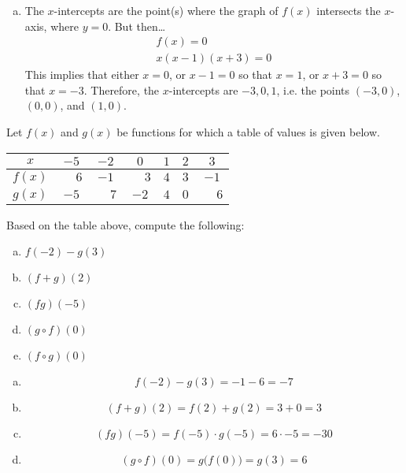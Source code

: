 \documentclass[12pt,letterpaper]{exam}
\begin{document}
\begin{questions}
\begin{enumerate}[(a)]
\item The $x$-intercepts are the point(s) where the graph of $f(x)$ intersects the $x$-axis, where $y= 0$. But then\dots
	\[
	\begin{aligned}
	f(x)= 0 \\
	x(x - 1)(x + 3)= 0
	\end{aligned}
	\]
This implies that either $x= 0$, or $x - 1=0$ so that $x= 1$, or $x + 3= 0$ so that $x= -3$. Therefore, the $x$-intercepts are $-3, 0, 1$, i.e. the points $(-3, 0)$, $(0, 0)$, and $(1, 0)$. 
\end{enumerate}



\newpage
\question[10] Let $f(x)$ and $g(x)$ be functions for which a table of values is given below. \par
	\begin{table}[ht]
	\centering
	\begin{tabular}{|c||c|c|c|c|c|c|} \hline 
	$x$ & $-5$ & $-2$ & $0$ & $1$ & $2$ & $3$ \\ \hline \hline
	$f(x)$ & $\phantom{-}6$ & $-1$ & $\phantom{-}3$ & $4$ & $3$ & $-1$ \\ \hline
	$g(x)$ & $-5$ & $\phantom{-}7$ & $-2$ & $4$ & $0$ & $\phantom{-}6$ \\ \hline 
	\end{tabular}
	\end{table} \par
Based on the table above, compute the following:
	\begin{enumerate}[(a)]
	\item $f(-2) - g(3)$
	\item $(f + g)(2)$
	\item $(fg)(-5)$
	\item $(g \circ f)(0)$
	\item $(f \circ g)(0)$
	\end{enumerate} \pspace

\sol 
\begin{enumerate}[(a)]
\item 
	\[
	f(-2) - g(3)= -1 - 6= -7
	\] \pspace 

\item 
	\[
	(f + g)(2)= f(2) + g(2)= 3 + 0= 3
	\] \pspace 

\item 
	\[
	(fg)(-5)= f(-5) \cdot g(-5)= 6 \cdot -5= -30
	\] \pspace 

\item 
	\[
	(g \circ f)(0)= g \big( f(0) \big)= g(3)= 6
	\] \pspace 


\end{enumerate}
\end{questions}
\end{document}
